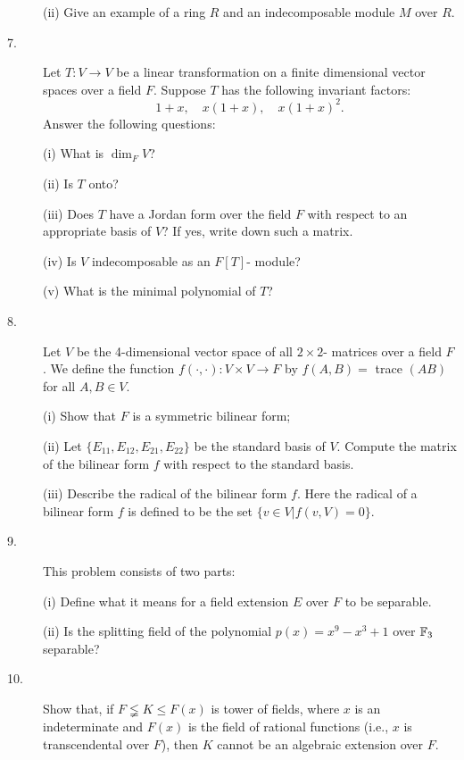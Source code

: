 \documentclass{article}
\begin{document}
\begin{description}
\item[\quad] (ii)
Give an example of a ring $R$ and an indecomposable module $M$ over $R$.

\item[7.]
Let $T: V \to V$ be a linear transformation on a finite dimensional vector
spaces over a field $F$. Suppose $T$ has the following invariant factors:
$$1+x, \quad x(1+x), \quad x(1+x)^2.$$
Answer the following questions:

\item[\quad] (i)
What is $\dim_F V$?

\item[\quad] (ii)
Is $T$ onto?

\item[\quad] (iii)
Does $T$ have a Jordan form over the field $F$ with respect to an
appropriate basis of $V$? If yes, write down such a matrix.

\item[\quad] (iv)
Is $V$ indecomposable as an $F[T]$- module?

\item[\quad] (v)
What is the minimal polynomial of $T$?

\item[8.]
Let $V$ be the 4-dimensional vector space of all $2 \times 2$- matrices
over a field $F$. We define the function $f(\cdot, \cdot) : V \times V \to F$
by $f(A,B) =$ trace $(AB)$ for all $A, B \in V$.

\item[\quad] (i)
Show that $F$ is a symmetric bilinear form;

\item[\quad] (ii)
Let $\{E_{11}, E_{12}, E_{21}, E_{22} \}$ be the standard basis of $V$.
Compute the matrix of the bilinear form $f$ with respect to the standard
basis.

\item[\quad] (iii)
Describe the radical of the bilinear form $f$. Here the radical of a
bilinear form $f$ is defined to be the set
$\{v \in V | f(v,V) = 0\}$.

\item[9.]
This problem consists of two parts:

\item[\quad] (i)
Define what it means for a field extension $E$ over $F$ to be separable.

\item[\quad] (ii)
Is the splitting field of the polynomial $p(x) = x^9 - x^3 + 1$ over
$\Bbb F_3$ separable?

\item[10.]
Show that, if $F \lneqq K \leq F(x)$ is tower of fields, where $x$ is an
indeterminate and $F(x)$ is the field of rational functions (i.e., $x$ is
transcendental over $F$), then $K$ cannot be an algebraic extension over
$F$.




\end{description}    
\end{document}
